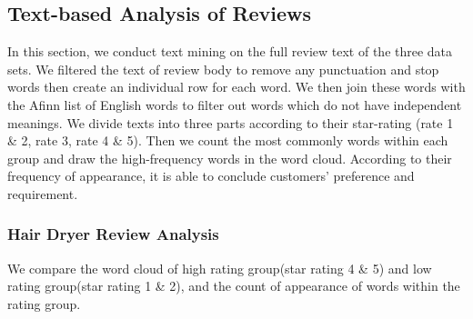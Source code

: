\documentclass[12pt]{article}
\begin{document}
\subsection{Text-based Analysis of Reviews}
In this section, we conduct text mining on the full review text of the three data sets. We filtered the text of review body to remove any punctuation and stop words then create an individual row for each word. We then join these words with the Afinn list of English words to filter out words which do not have independent meanings. We divide texts into three parts according to their star-rating (rate 1 \& 2, rate 3, rate 4 \& 5). Then we count the most commonly words within each group and draw the high-frequency words in the word cloud. According to their frequency of appearance, it is able to conclude customers' preference and requirement. 
\subsubsection{Hair Dryer Review Analysis}
We compare the word cloud of high rating group(star rating 4 \& 5) and low rating group(star rating 1 \& 2), and the count of appearance of words within the rating group. 
\end{document}
